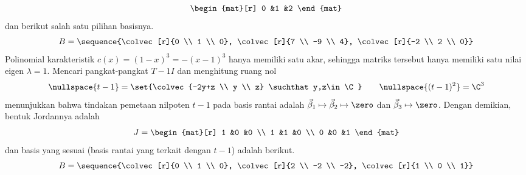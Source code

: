 \begin{exercises}
\begin{answer}
\begin{exparts}
\begin{equation*}
\begin{mat}[r]
                    0  &1  &2
                  \end{mat}
            \end{equation*}
            dan berikut salah satu pilihan basisnya.
            \begin{equation*}
              B=\sequence{\colvec[r]{0 \\ 1 \\ 0},
                          \colvec[r]{7 \\ -9 \\ 4},
                          \colvec[r]{-2 \\ 2 \\ 0}}
            \end{equation*}
        \partsitem Polinomial karakteristik
            \( c(x)=(1-x)^3=-(x-1)^3 \) hanya memiliki satu akar,
            sehingga matriks tersebut hanya memiliki satu nilai eigen $\lambda=1$.
            Mencari pangkat-pangkat $T-1I$
            dan menghitung ruang nol
            \begin{equation*}
               \nullspace{t-1}=\set{\colvec{-2y+z \\ y \\ z}
                                      \suchthat y,z\in\C} 
               \qquad
               \nullspace{(t-1)^2}=\C^3 
            \end{equation*}
            menunjukkan bahwa tindakan pemetaan nilpoten $t-1$ pada basis
            rantai adalah
            $\vec{\beta}_1\mapsto\vec{\beta}_2\mapsto\zero$ dan
            $\vec{\beta}_3\mapsto\zero$.
            Dengan demikian, bentuk Jordannya adalah
            \begin{equation*}
                  J=
                  \begin{mat}[r]
                    1  &0  &0  \\
                    1  &1  &0  \\
                    0  &0  &1
                  \end{mat}
            \end{equation*}
            dan basis yang sesuai (basis rantai yang terkait dengan
            $t-1$) adalah berikut.
            \begin{equation*}
              B=\sequence{\colvec[r]{0 \\ 1 \\ 0},
                          \colvec[r]{2 \\ -2 \\ -2},
                          \colvec[r]{1 \\ 0 \\ 1}}

\end{equation*}
\end{exparts}
\end{answer}
\end{exercises}
